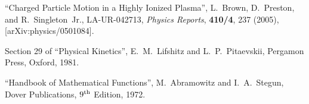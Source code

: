 \documentclass[preprint,12pt,eqsecnum,nofootinbib,amsmath,amssymb]{revtex4}
\begin{document}
\pagebreak
\begin{thebibliography}{99}

  ``Charged Particle Motion in a Highly Ionized Plasma'', 
  L.~Brown, D.~Preston, and R.~Singleton~Jr., LA-UR-042713, 
  {\it Physics Reports}, {\bf 410/4}, 237 (2005), 
  [arXiv:physics/0501084].


  Section 29 of ``Physical Kinetics'',  E.~M.~Lifshitz and 
  L.~P.~Pitaevskii, Pergamon Press, Oxford, 1981.

``Handbook of Mathematical Functions'', M.~Abramowitz and 
I.~A.~Stegun, Dover Publications, $9^{\rm th}$ Edition,
1972. 



\end{thebibliography}
\end{document}
